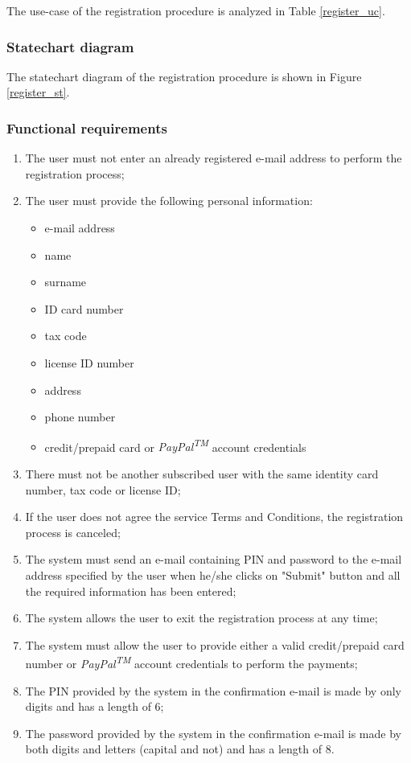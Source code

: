 The use-case of the registration procedure is analyzed in Table \ref{register_uc}.

\subsubsection{Statechart diagram}

The statechart diagram of the registration procedure is shown in Figure \ref{register_st}.

\subsubsection{Functional requirements}
\begin{enumerate}
\item The user must not enter an already registered e-mail address to perform the registration process;
\item The user must provide the following personal information:
	\begin{itemize}
	\item e-mail address
	\item name
	\item surname
	\item ID card number
	\item tax code
	\item license ID number
	\item address
	\item phone number
	\item credit/prepaid card or \emph{PayPal\textsuperscript{TM}} account credentials
	\end{itemize}
\item There must not be another subscribed user with the same identity card number, tax code or license ID;
\item If the user does not agree the service Terms and Conditions, the registration process is canceled;
\item The system must send an e-mail containing PIN and password to the e-mail address specified by the user when he/she clicks on "Submit" button and all the required information has been entered;
\item The system allows the user to exit the registration process at any time;
\item The system must allow the user to provide either a valid credit/prepaid card number or \emph{PayPal\textsuperscript{TM}} account credentials to perform the payments;
\item The PIN provided by the system in the confirmation e-mail is made by only digits and has a length of 6;
\item The password provided by the system in the confirmation e-mail is made by both digits and letters (capital and not) and has a length of 8.
\end{enumerate}

